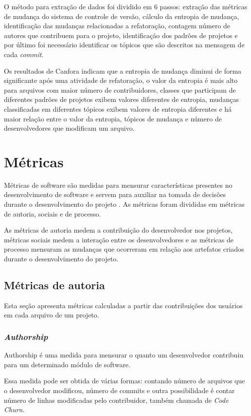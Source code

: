 O método para extração de dados foi dividido em 6 passos: extração das métricas de mudança do sistema de controle de versão, cálculo da entropia de mudança, identificação das mudanças relacionadas a refatoração, contagem número de autores que contribuem para o projeto, identificação dos padrões de projetos e por último foi necessário identificar os tópicos que são descritos na mensagem de cada \textit{commit}. 

Os resultados de Canfora indicam que a entropia de mudança diminui de forma significante após uma atividade de refatoração, o valor da entropia é mais alto para arquivos com maior número de contribuidores, classes que participam de diferentes padrões de projetos exibem valores diferentes de entropia, mudanças classificadas em diferentes tópicos exibem valores de entropia diferentes e há maior relação entre o valor da entropia, tópicos de mudança e número de desenvolvedores que modificam um arquivo. 

\section{Métricas}
Métricas de software são medidas para mensurar características presentes no desenvolvimento de software e servem para auxiliar na tomada de decisões durante o desenvolvimento do projeto \cite{koscianski2007qualidade}. As métricas foram divididas em métricas de autoria, sociais e de processo. 

As métricas de autoria medem a contribuição do desenvolvedor nos projetos, métricas sociais medem a interação entre os desenvolvedores e as métricas de processo mensuram as mudanças que ocorreram em relação aos artefatos criados durante o desenvolvimento do projeto.

\subsection{Métricas de autoria}
Esta seção apresenta métricas calculadas a partir das contribuições dos usuários em cada arquivo de um projeto.

\subsubsection{\textit{Authorship}}
Authorship é uma medida para mensurar o quanto um desenvolvedor contribuiu para um determinado módulo de software.

Essa medida pode ser obtida de várias formas: contando número de arquivos que o desenvolvedor modificou, número de commits e outra possibilidade é contar número de linhas modificadas pelo contribuidor, também chamada de \textit{Code Churn}\cite{Munson:1998:CCM:850947.853326}.

